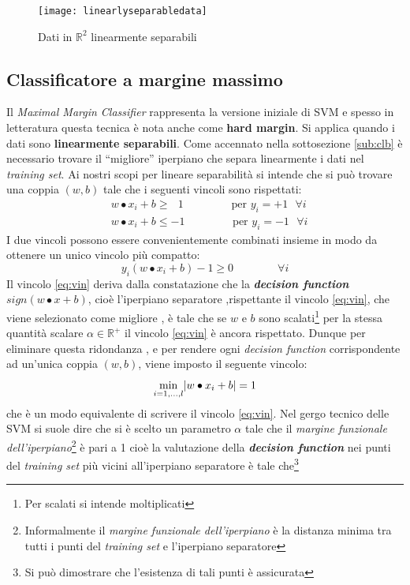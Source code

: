  \begin{figure}[htp]
	\centering
	\texttt{[image: linearlyseparabledata]}
	\caption[Lineare separabilità]{Dati in $\mathbb{R}^{2}$ linearmente separabili}
   \label{fig:lsd}
\end{figure}

\subsection{Classificatore  a margine massimo}
Il \textit{Maximal Margin Classifier} rappresenta la versione iniziale di \ac{SVM} e spesso in letteratura questa tecnica è nota anche come \textbf{hard margin}. Si applica quando i dati sono \textbf{linearmente separabili}. Come accennato nella sottosezione \ref{sub:clb} è necessario trovare il ``migliore'' iperpiano che separa linearmente i dati nel \textit{training set}. Ai nostri scopi per lineare separabilità si intende che si può trovare una coppia $(w,b)$ tale che i seguenti vincoli sono rispettati:
\begin{align*}
&w \bullet x_i + b \geq \:\:\:1 \quad \quad \qquad\text{ per } y_i = +1 \:\:\:\forall i\\
&w \bullet x_i + b \leq -1 \quad \quad \qquad\text{ per } y_i = -1 \:\:\:\forall i
\end{align*}
I due vincoli possono essere convenientemente combinati insieme in modo da ottenere un unico vincolo più compatto:
\begin{equation}
\label{eq:vin}
y_i(w \bullet x_i + b) - 1 \geq 0 \qquad \qquad \forall i
\end{equation}
Il vincolo \eqref{eq:vin}  deriva dalla constatazione che la \textit{\textbf{decision function}} $sign(w \bullet x + b)$, cioè l'iperpiano separatore ,rispettante il vincolo \eqref{eq:vin}, che viene selezionato come migliore , è tale che se $w$ e $b$ sono scalati\footnote{Per scalati si intende moltiplicati} per la stessa quantità scalare $\alpha \in \mathbb{R}^{+}$  il vincolo \eqref{eq:vin} è ancora rispettato. Dunque per eliminare questa ridondanza , e per rendere ogni \textit{decision function} corrispondente ad un'unica coppia $(w,b)$, viene imposto il seguente vincolo:
\begin{equation}
\label{eq:vin2}
\min_{i=1,\dots,l}^{}\lvert w \bullet x_{i} + b\rvert = 1
\end{equation}
che è un modo equivalente di scrivere il vincolo \eqref{eq:vin}.  Nel gergo tecnico delle \ac{SVM} si suole dire che si è scelto un parametro $\alpha$ tale che il \textit{margine funzionale dell'iperpiano}\footnote{Informalmente il \textit{margine funzionale dell'iperpiano} è la distanza minima tra tutti i punti del \textit{training set} e l'iperpiano separatore} è pari a 1 cioè la valutazione della \textit{\textbf{decision function}} nei punti del \textit{training set}  più vicini all'iperpiano separatore è tale che\footnote{Si può dimostrare che l'esistenza di tali punti è assicurata}
